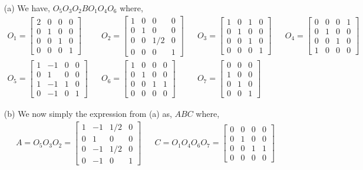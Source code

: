 \documentclass[10pt]{article}
\begin{document}
\begin{solution}[Solution]
\begin{enumerate}
	\item[(a)] We have, \( O_5O_3 O_2 B O_1 O_4O_6 \) where,
	\begin{align*}
	O_1 = \left[\begin{array}{cccc}2&0&0&0 \\ 0&1&0&0 \\ 0&0&1&0 \\ 0&0&0&1\end{array}\right] &&
	O_2 = \left[\begin{array}{cccc}1&0&0&0 \\ 0&1&0&0 \\ 0&0&1/2&0 \\ 0&0&0&1\end{array}\right] &&
	O_3 = \left[\begin{array}{cccc}1&0&1&0 \\ 0&1&0&0 \\ 0&0&1&0 \\ 0&0&0&1\end{array}\right] &&
	O_4 = \left[\begin{array}{cccc}0&0&0&1 \\ 0&1&0&0 \\ 0&0&1&0 \\ 1&0&0&0\end{array}\right] \\
	O_5 = \left[\begin{array}{cccc}1&-1&0&0 \\ 0&1&0&0 \\ 1&-1&1&0 \\ 0&-1&0&1\end{array}\right] &&
	O_6 = \left[\begin{array}{cccc}1&0&0&0 \\ 0&1&0&0 \\ 0&0&1&1 \\ 0&0&0&0\end{array}\right] &&
	O_7 = \left[\begin{array}{ccc}0&0&0 \\ 1&0&0 \\ 0&1&0 \\ 0&0&1\end{array}\right]
	\end{align*}
	\item[(b)] We now simply the expression from (a) as, \( ABC\) where,
	\begin{align*}
	A = O_5O_3O_2= \left[\begin{array}{cccc}1&-1&1/2&0 \\ 0&1&0&0 \\ 0&-1&1/2&0 \\ 0&-1&0&1\end{array}\right] && 
	C = O_1O_4O_6O_7 =\left[\begin{array}{cccc}0&0&0&0 \\ 0&1&0&0 \\ 0&0&1&1 \\ 0&0&0&0\end{array}\right]
	\end{align*}
\end{enumerate}
	

\end{solution}
\end{document}
